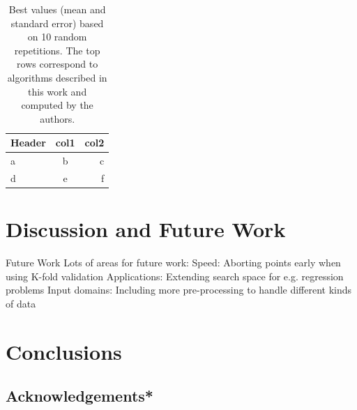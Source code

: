 \documentclass[wcp]{jmlr}
\begin{document}
\begin{table}
    \caption{
        Best values (mean and standard error) based on 10 random repetitions.
        The top rows correspond to algorithms described in this work and computed by the authors.
    }
    \label{tbl:acc}
    \centering
    \small
    \begin{tabular}{l|cr}
        \hline
        Header & col1 & col2 \\
        \hline
        a & b & c \\
        d & e & f
    \end{tabular}
\end{table}



\section{Discussion and Future Work}
Future Work
Lots of areas for future work:
Speed: Aborting points early when using K-fold validation
Applications: Extending search space for e.g. regression problems
Input domains: Including more pre-processing to handle different kinds of data


\section{Conclusions}


\subsection{Acknowledgements*}


\end{document}
